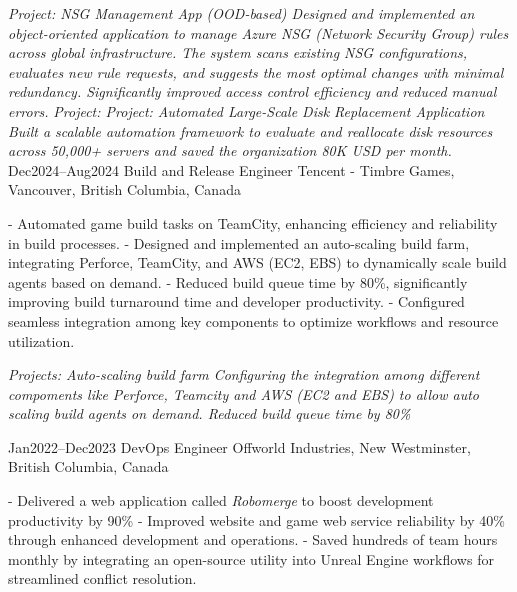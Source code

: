 \documentclass[9pt]{developercv} %
\begin{document}
\begin{entrylist}
{			\textit{Project: NSG Management App (OOD-based)\newline
			Designed and implemented an object-oriented application to manage Azure NSG (Network Security Group) rules across global infrastructure. The system scans existing NSG configurations, evaluates new rule requests, and suggests the most optimal changes with minimal redundancy. Significantly improved access control efficiency and reduced manual errors.\newline}\newline
            \textit{Project: Project: Automated Large-Scale Disk Replacement Application\newline
            Built a scalable automation framework to evaluate and reallocate disk resources across 50,000+ servers and saved the organization 80K USD per month.}\newline\newline
        }
	\entry
		{Dec2024--Aug2024}
		{Build and Release Engineer}
		{Tencent - Timbre Games, Vancouver, British Columbia, Canada}
		{
            - Automated game build tasks on TeamCity, enhancing efficiency and reliability in build processes. \newline
            - Designed and implemented an auto-scaling build farm, integrating Perforce, TeamCity, and AWS (EC2, EBS) to dynamically scale build agents based on demand.\newline
            - Reduced build queue time by 80\%, significantly improving build turnaround time and developer productivity.\newline
            - Configured seamless integration among key components to optimize workflows and resource utilization.\newline

            \textit{Projects: Auto-scaling build farm\newline
            Configuring the integration among different compoments like Perforce, Teamcity and AWS (EC2 and EBS) to allow 
            auto scaling build agents on demand. Reduced build queue time by 80\%\newline}
        }
	\entry
		{Jan2022--Dec2023}
		{DevOps Engineer}
		{Offworld Industries, New Westminster, British Columbia, Canada}
		{
            - Delivered a web application called \textit{Robomerge} to boost development productivity by 90\%\newline
            - Improved website and game web service reliability by 40\% through enhanced development and operations.\newline
            - Saved hundreds of team hours monthly by integrating an open-source utility into Unreal Engine workflows for streamlined conflict resolution.\newline

}
\end{entrylist}
\end{document}
